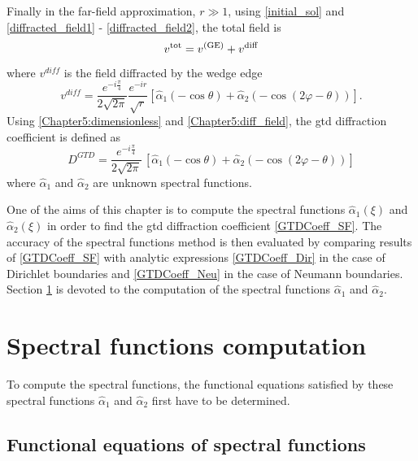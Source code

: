 Finally in the far-field approximation, $r \gg 1$, using \eqref{initial_sol} and \eqref{diffracted_field1} - \eqref{diffracted_field2}, the total field is 
\begin{equation}
v^{\rm tot} = v^{\rm (GE)} + v^{\rm diff}
\end{equation}
where $v^{diff}$ is the field diffracted by the wedge edge
\begin{equation}
\label{Chapter5:diff_field}
v^{ diff} = \dfrac{e^{-i\frac{\pi}{4}}}{2\sqrt{2\pi}} \dfrac{e^{-ir}}{\sqrt{r}} [\hat{\alpha}_1( - \cos \theta) + \hat{\alpha}_2( - \cos ( 2\varphi - \theta))].
\end{equation}
Using \eqref{Chapter5:dimensionless} and \eqref{Chapter5:diff_field}, the \acrshort{gtd} diffraction coefficient is defined as
\begin{equation}
\label{GTDCoeff_SF}
D^{GTD} = \dfrac{e^{-i\frac{\pi}{4}}}{2\sqrt{2\pi}} \, [\hat{\alpha}_1( - \cos \theta) + \hat{\alpha}_2( - \cos ( 2\varphi - \theta))]
\end{equation}
where $\hat{\alpha}_1$ and $\hat{\alpha}_2$ are unknown spectral functions. 

One of the aims of this chapter is to compute the spectral functions $\hat{\alpha}_1(\xi)$ and $\hat{\alpha}_2(\xi)$ in order to find the \acrshort{gtd} diffraction coefficient \eqref{GTDCoeff_SF}. The accuracy of the spectral functions method is then evaluated by comparing results of \eqref{GTDCoeff_SF} with analytic expressions \eqref{GTDCoeff_Dir} in the case of Dirichlet boundaries and \eqref{GTDCoeff_Neu} in the case of Neumann boundaries. Section \ref{Chapter5:resolution} is devoted to the computation of the spectral functions $\hat{\alpha}_1$ and $\hat{\alpha}_2$.

\section{Spectral functions computation}
\label{Chapter5:resolution}

To compute the spectral functions, the functional equations satisfied by these spectral functions $\hat{\alpha}_1$ and $\hat{\alpha}_2$ first have to be determined.
\subsection{Functional equations of spectral functions}

